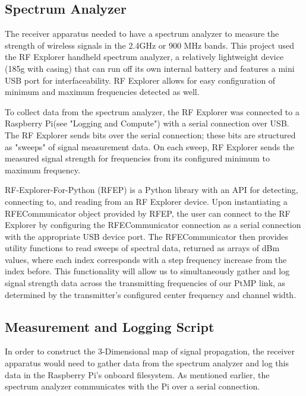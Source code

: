 \documentclass[pageno]{jpaper}
\begin{document}
\subsection{Spectrum Analyzer}
The receiver apparatus needed to have a spectrum analyzer to measure the strength of wireless signals in the 2.4GHz or 900 MHz bands. This project used the RF Explorer handheld spectrum analyzer, a relatively lightweight device (185g with casing) that can run off its own internal battery and features a mini USB port for interfaceability\cite{rfe}. RF Explorer allows for easy configuration of minimum and maximum frequencies detected as well.

To collect data from the spectrum analyzer, the RF Explorer was connected to a Raspberry Pi(see "Logging and Compute") with a serial connection over USB. The RF Explorer sends bits over the serial connection; these bits are structured as "sweeps" of signal measurement data.  On each sweep, RF Explorer sends the measured signal strength for frequencies from its configured minimum to maximum frequency. 

RF-Explorer-For-Python (RFEP) is a Python library with an API for detecting, connecting to, and reading from an RF Explorer device. Upon instantiating a RFECommunicator object provided by RFEP, the user can connect to the RF Explorer by configuring the RFECommunicator connection as a serial connection with the appropriate USB device port. The RFECommunicator then provides utility functions to read sweeps of spectral data, returned as arrays of dBm values, where each index corresponds with a step frequency increase from the index before. This functionality will allow us to simultaneously gather and log signal strength data across the transmitting frequencies of our PtMP link, as determined by the transmitter's configured center frequency and channel width.

\subsection{Measurement and Logging Script}

In order to construct the 3-Dimensional map of signal propagation, the receiver apparatus would need to gather data from the spectrum analyzer and log this data in the Raspberry Pi's onboard filesystem. As mentioned earlier, the spectrum analyzer communicates with the Pi over a serial connection.
\end{document}
